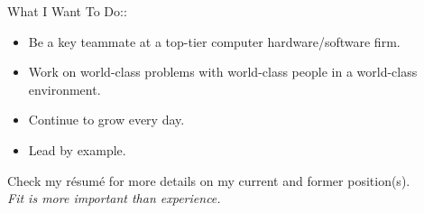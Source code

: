 What I Want To Do::

\begin{itemize}
\item Be a key teammate at a top-tier computer hardware/software firm.
\item Work on world-class problems with world-class people in a world-class environment.
\item Continue to grow every day.
\item Lead by example.
\end{itemize}

Check my r\'esum\'e for more details on my current and former position(s).\\
\emph{Fit is more important than experience.}

